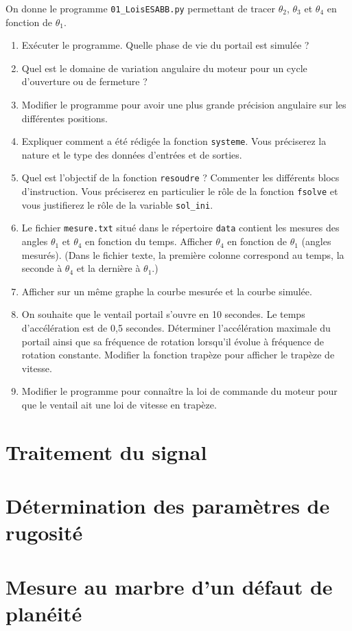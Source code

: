 \documentclass[10pt,fleqn]{article} %
\begin{document}
On donne le programme \texttt{01\_LoisESABB.py} permettant de tracer $\theta_2$, $\theta_3$ et $\theta_4$ en fonction de $\theta_1$.
\begin{enumerate}
\item Exécuter le programme. Quelle phase de vie du portail est simulée ?
\item Quel est le domaine de variation angulaire du moteur pour un cycle d'ouverture ou de fermeture ?
\item Modifier le programme pour avoir une plus grande précision angulaire sur les différentes positions.
\item Expliquer comment a été rédigée la fonction \texttt{systeme}. Vous préciserez la nature et le type des données d'entrées et de sorties. 
\item Quel est l'objectif de la fonction \texttt{resoudre} ? Commenter les différents blocs d'instruction. Vous préciserez en particulier le rôle de la fonction \texttt{fsolve} et vous justifierez le rôle de la variable \texttt{sol\_ini}.
\item Le fichier \texttt{mesure.txt} situé dans le répertoire \texttt{data} contient les mesures des angles $\theta_1$ et $\theta_4$ en fonction du temps. Afficher $\theta_4$ en fonction de $\theta_1$ (angles mesurés). (Dans le fichier texte, la première colonne correspond au temps, la seconde à $\theta_4$ et la dernière à $\theta_1$.)
\item Afficher sur un même graphe la courbe mesurée et la courbe simulée.  
\item On souhaite que le ventail portail s'ouvre en 10 secondes. Le temps d'accélération est de 0,5 secondes. Déterminer l'accélération maximale du portail ainsi que sa fréquence de rotation lorsqu'il évolue à fréquence de rotation constante. Modifier la fonction trapèze pour afficher le trapèze de vitesse. 
\item Modifier le programme pour connaître la loi de commande du moteur pour que le ventail ait une loi de vitesse en trapèze. 


\end{enumerate}




\section{Traitement du signal }%


\section{Détermination des paramètres de rugosité}

\newpage
\section{Mesure au marbre d'un défaut de planéité}
\end{document}
